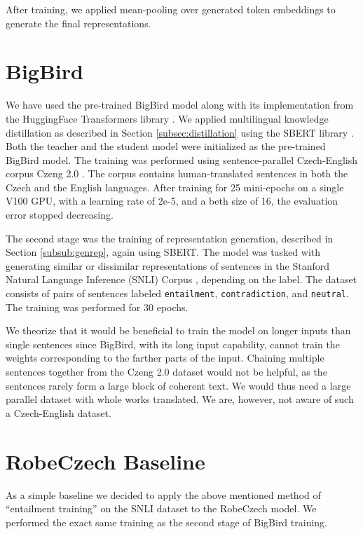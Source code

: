 After training, we applied mean-pooling over generated token embeddings to generate the final representations.

\section{BigBird}

We have used the pre-trained BigBird model along with its implementation from the HuggingFace Transformers library \citep{huggingface}. 
We applied multilingual knowledge distillation as described in Section \ref{subsec:distillation} using the SBERT library \citep{sbert}. 
Both the teacher and the student model were initialized as the pre-trained BigBird model.
The training was performed using sentence-parallel Czech-English corpus Czeng 2.0 \citep{czeng2.0}. 
The corpus contains human-translated sentences in both the Czech and the English languages. 
After training for 25 mini-epochs on a single V100 GPU, with a learning rate of 2e-5, and a beth size of 16, the evaluation error stopped decreasing.

The second stage was the training of representation generation, described in Section \ref{subsub:genrep}, again using SBERT.
The model was tasked with generating similar or dissimilar representations of sentences in the Stanford Natural Language Inference (SNLI) Corpus \citep{snli}, depending on the label.
The dataset consists of pairs of sentences labeled \texttt{entailment}, \texttt{contradiction}, and \texttt{neutral}.
The training was performed for 30 epochs.

We theorize that it would be beneficial to train the model on longer inputs than single sentences since BigBird, with its long input capability, cannot train the weights corresponding to the farther parts of the input.
Chaining multiple sentences together from the Czeng 2.0 dataset would not be helpful, as the sentences rarely form a large block of coherent text.
We would thus need a large parallel dataset with whole works translated.
We are, however, not aware of such a Czech-English dataset.

\section{RobeCzech Baseline}

As a simple baseline we decided to apply the above mentioned method of ``entailment training'' on the SNLI dataset to the RobeCzech model.
We performed the exact same training as the second stage of BigBird training.

